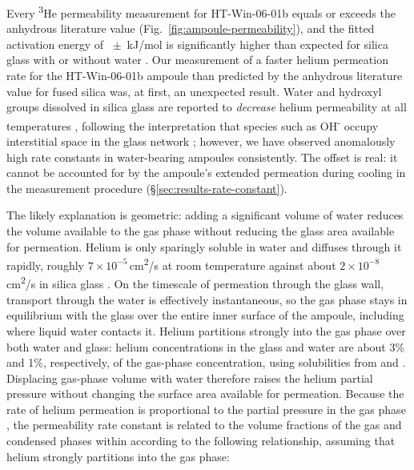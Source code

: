 Every \textsuperscript{3}He permeability measurement for HT-Win-06-01b equals or exceeds the anhydrous literature value (Fig.~\ref{fig:ampoule-permeability}), and the fitted activation energy of \ChTwoPermEakJ\ $\pm$ \ChTwoPermEaErrkJ\,kJ/mol is significantly higher than expected for silica glass with or without water \citep{swets1961,jones1953,masaryk1968,shelby1972}. Our measurement of a faster helium permeation rate for the HT-Win-06-01b ampoule than predicted by the anhydrous literature value for fused silica was, at first, an unexpected result. Water and hydroxyl groups dissolved in silica glass are reported to \emph{decrease} helium permeability at all temperatures \citep{tsuru2011,shelby1972,masaryk1968}, following the interpretation that species such as OH\textsuperscript{-} occupy interstitial space in the glass network \citep{norton1953,shackelford1999}; however, we have observed anomalously high rate constants in water-bearing ampoules consistently. The offset is real: it cannot be accounted for by the ampoule's extended permeation during cooling in the measurement procedure (\S\ref{sec:results-rate-constant}).

The likely explanation is geometric: adding a significant volume of water reduces the volume available to the gas phase without reducing the glass area available for permeation. Helium is only sparingly soluble in water and diffuses through it rapidly, roughly $7 \times 10^{-5}$\,cm\textsuperscript{2}/s at room temperature \citep{verhallen1984} against about $2 \times 10^{-8}$\,cm\textsuperscript{2}/s in silica glass \citep{swets1961}. On the timescale of permeation through the glass wall, transport through the water is effectively instantaneous, so the gas phase stays in equilibrium with the glass over the entire inner surface of the ampoule, including where liquid water contacts it. Helium partitions strongly into the gas phase over both water and glass: helium concentrations in the glass and water are about 3\% and 1\%, respectively, of the gas-phase concentration, using solubilities from \citet{sander2015} and \citet{swets1961}. Displacing gas-phase volume with water therefore raises the helium partial pressure without changing the surface area available for permeation. Because the rate of helium permeation is proportional to the partial pressure in the gas phase \citep{norton1953,altemose1961,swets1961,masaryk1968}, the permeability rate constant is related to the volume fractions of the gas and condensed phases within according to the following relationship, assuming that helium strongly partitions into the gas phase:

